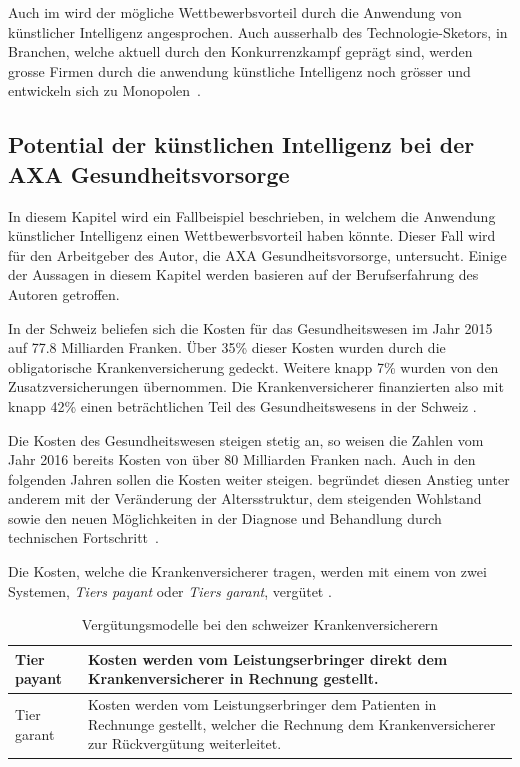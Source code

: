 \documentclass{hwz}
\begin{document}
Auch im \textcite{TheEconomist2018TheAI} wird der mögliche Wettbewerbsvorteil durch die Anwendung von künstlicher Intelligenz angesprochen. Auch ausserhalb des Technologie-Sketors, in Branchen, welche aktuell durch den Konkurrenzkampf geprägt sind, werden grosse Firmen durch die anwendung künstliche Intelligenz noch grösser und entwickeln sich zu Monopolen~\autocite{TheEconomist2018TheAI}.

\subsection{Potential der künstlichen Intelligenz bei der AXA Gesundheitsvorsorge}

In diesem Kapitel wird ein Fallbeispiel beschrieben, in welchem die Anwendung künstlicher Intelligenz einen Wettbewerbsvorteil haben könnte. Dieser Fall wird für den Arbeitgeber des Autor, die AXA Gesundheitsvorsorge, untersucht. Einige der Aussagen in diesem Kapitel werden basieren auf der Berufserfahrung des Autoren getroffen.

In der Schweiz beliefen sich die Kosten für das Gesundheitswesen im Jahr 2015 auf 77.8 Milliarden Franken. Über 35\% dieser Kosten wurden durch die obligatorische Krankenversicherung gedeckt. Weitere knapp 7\% wurden von den Zusatzversicherungen übernommen. Die Krankenversicherer finanzierten also mit knapp 42\% einen beträchtlichen Teil des Gesundheitswesens in der Schweiz \autocite{BfS2018Finanzierung, BfS2017KostenDaten}.

Die Kosten des Gesundheitswesen steigen stetig an, so weisen die Zahlen vom Jahr 2016 bereits Kosten von über 80 Milliarden Franken nach. Auch in den folgenden Jahren sollen die Kosten weiter steigen. \textcite{Kirchgassner2009DasKostenentwicklung} begründet diesen Anstieg unter anderem mit der Veränderung der Altersstruktur, dem steigenden Wohlstand sowie den neuen Möglichkeiten in der Diagnose und Behandlung durch technischen Fortschritt~\autocite{BfS2018Finanzierung, Kirchgassner2009DasKostenentwicklung}.

Die Kosten, welche die Krankenversicherer tragen, werden mit einem von zwei Systemen, \textit{Tiers payant} oder \textit{Tiers garant}, vergütet \autocite{EDI2017FaktenblattVergutungssysteme}. 

\begin{table}
    \renewcommand{\arraystretch}{1.25}
    \setlength{\tabcolsep}{5pt}
    \caption{Vergütungsmodelle bei den schweizer Krankenversicherern}
    \begin{tabular}{| p{} | p{} |}
        \hline
         Tier payant & Kosten werden vom Leistungserbringer direkt dem Krankenversicherer in Rechnung gestellt. \\
        \hline
         Tier garant & Kosten werden vom Leistungserbringer dem Patienten in Rechnunge gestellt, welcher die Rechnung dem Krankenversicherer zur Rückvergütung weiterleitet. \\
        \hline
    \end{tabular}
\end{table}
\end{document}
